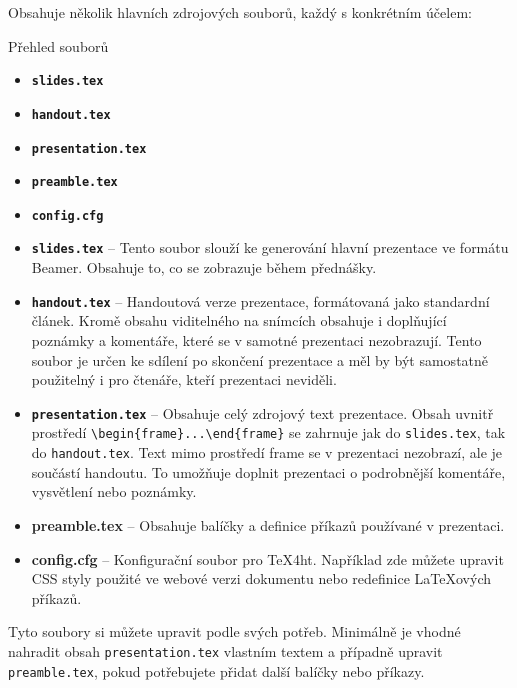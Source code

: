Obsahuje několik hlavních zdrojových souborů, každý s konkrétním účelem:

\begin{frame}[fragile]{Přehled souborů}
\begin{itemize}
\item \textbf{\texttt{slides.tex}}
\item \textbf{\texttt{handout.tex}}
\item \textbf{\texttt{presentation.tex}}
\item \textbf{\texttt{preamble.tex}}
\item \textbf{\texttt{config.cfg}}
\end{itemize}
\end{frame}

\begin{itemize}
\item \textbf{\texttt{slides.tex}} – Tento soubor slouží ke generování hlavní prezentace ve formátu Beamer. Obsahuje to, co se zobrazuje během přednášky.

\item \textbf{\texttt{handout.tex}} – Handoutová verze prezentace, formátovaná jako standardní článek. Kromě obsahu viditelného na snímcích obsahuje i doplňující poznámky a komentáře, které se v samotné prezentaci nezobrazují. Tento soubor je určen ke sdílení po skončení prezentace a měl by být samostatně použitelný i pro čtenáře, kteří prezentaci neviděli.

\item \textbf{\texttt{presentation.tex}} – Obsahuje celý zdrojový text prezentace. Obsah uvnitř prostředí \verb|\begin{frame}...\end{frame}| se zahrnuje jak do \texttt{slides.tex}, tak do \texttt{handout.tex}. Text mimo prostředí frame se v prezentaci nezobrazí, ale je součástí handoutu. To umožňuje doplnit prezentaci o podrobnější komentáře, vysvětlení nebo poznámky.

\item \textbf{preamble.tex} – Obsahuje balíčky a definice příkazů používané v prezentaci.

\item \textbf{config.cfg} – Konfigurační soubor pro \TeX4ht. Například zde můžete upravit CSS styly použité ve webové verzi dokumentu nebo redefinice \LaTeX{}ových příkazů.
\end{itemize}

Tyto soubory si můžete upravit podle svých potřeb. Minimálně je vhodné nahradit obsah \texttt{presentation.tex} vlastním textem a případně upravit \texttt{preamble.tex}, pokud potřebujete přidat další balíčky nebo příkazy.

